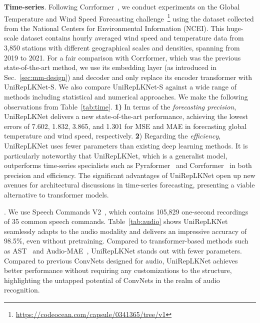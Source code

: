 \documentclass[10pt,twocolumn,letterpaper]{article}
\begin{document}
\textbf{Time-series}. Following Corrformer~\cite{wu2023interpretable}, we conduct experiments on the Global Temperature and Wind Speed Forecasting challenge~\footnote{\url{https://codeocean.com/capsule/0341365/tree/v1}} using the dataset collected from the National Centers for Environmental Information (NCEI). This huge-scale dataset contains hourly averaged wind speed and temperature data from 3,850 stations with different geographical scales and densities, spanning from 2019 to 2021. For a fair comparison with Corrformer, which was the previous state-of-the-art method, we use its embedding layer (as introduced in Sec.~\ref{sec:mm-design}) and decoder and only replace its encoder transformer with UniRepLKNet-S. We also compare UniRepLKNet-S against a wide range of methods including statistical and numerical approaches. We make the following observations from Table~\ref{tab:time}. \textbf{1)} In terms of the \emph{forecasting precision}, UniRepLKNet delivers a new state-of-the-art performance, achieving the lowest errors of 7.602, 1.832, 3.865, and 1.301 for MSE and MAE in forecasting global temperature and wind speed, respectively. \textbf{2}) Regarding the \emph{efficiency}, UniRepLKNet uses fewer parameters than existing deep learning methods. It is particularly noteworthy that UniRepLKNet, which is a generalist model, outperforms time-series specialists such as Pyraformer~\cite{liu2021pyraformer} and Corrformer~\cite{wu2023interpretable} in both precision and efficiency. The significant advantages of UniRepLKNet open up new avenues for architectural discussions in time-series forecasting, presenting a viable alternative to transformer models.

. We use Speech Commands V2~\cite{warden2018speech}, which contains 105,829 one-second recordings of 35 common speech commands. Table~\ref{tab:audio} shows UniRepLKNet seamlessly adapts to the audio modality and delivers an impressive accuracy of 98.5\%, even without pretraining. Compared to transformer-based methods such as AST~\cite{gong2021ast} and Audio-MAE~\cite{huang2022masked}, UniRepLKNet stands out with fewer parameters. Compared to previous ConvNets designed for audio, UniRepLKNet achieves better performance without requiring any customizations to the structure, highlighting the untapped potential of ConvNets in the realm of audio recognition.
\end{document}
